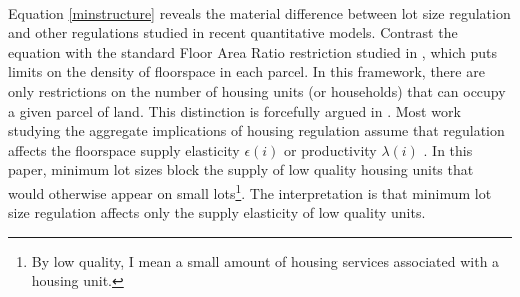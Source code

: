 \documentclass[12pt]{article}
\begin{document}
	\paragraph*{}
	Equation \eqref{minstructure} reveals the material difference between lot size regulation and other regulations studied in recent quantitative models. Contrast the equation with the standard Floor Area Ratio restriction studied in \cite{bruecknersingh}, which puts limits on the density of floorspace in each parcel. In this framework, there are only restrictions on the number of housing units (or households) that can occupy a given parcel of land. This distinction is forcefully argued in \cite{griesonwhite}. Most work studying the aggregate implications of housing regulation assume that regulation affects the floorspace supply elasticity $\epsilon(i)$ or productivity $\lambda(i)$ \citep{hseihmoretti, parkho, hop}. In this paper, minimum lot sizes block the supply of low quality housing units that would otherwise appear on small lots\footnote{By low quality, I mean a small amount of housing services associated with a housing unit.}. The interpretation is that minimum lot size regulation affects only the supply elasticity of low quality units.

	
\end{document}
